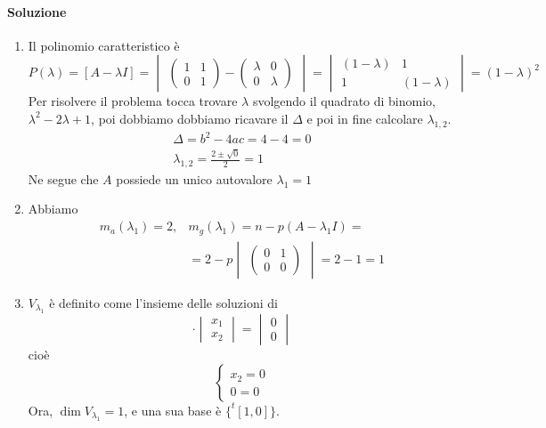 \documentclass{book}
\begin{document}
\paragraph{Soluzione}
\begin{enumerate}
\item Il polinomio caratteristico è
  \begin{equation*}
    P(\lambda)= [A-\lambda I] =
    \begin{vmatrix}
      \begin{pmatrix}
        1 & 1\\
        0 & 1
      \end{pmatrix}-
      \begin{pmatrix}
        \lambda & 0\\
        0 & \lambda
      \end{pmatrix}
    \end{vmatrix}=
    \begin{vmatrix}
      (1-\lambda) & 1 \\
      1 & (1-\lambda)
    \end{vmatrix}= (1-\lambda)^2
  \end{equation*}
Per risolvere il problema tocca trovare $\lambda$ svolgendo il quadrato di binomio, $\lambda^2-2\lambda+1$, poi dobbiamo dobbiamo ricavare il $\Delta$ e poi in fine calcolare $\lambda_{1,2}$.
\begin{eqnarray*}
  \Delta = b^2-4ac = 4 - 4 = 0\\
  \lambda_{1,2} = \frac{2\pm\sqrt{0}}{2}=1
\end{eqnarray*}
Ne segue che $A$ possiede un unico autovalore $\lambda_1=1$
\item Abbiamo
  \begin{eqnarray*}
    m_a(\lambda_1)=2, & m_g(\lambda_1)=n-p(A-\lambda_1I)=\\
    & = 2-p
      \begin{vmatrix}
        \begin{pmatrix}
          0 & 1 \\
          0 & 0
        \end{pmatrix}
      \end{vmatrix}= 2 - 1 = 1 
  \end{eqnarray*}
\item $V_{\lambda_1}$ è definito come l'insieme delle soluzioni di
  \begin{equation*}
    [A-\lambda_1I]\cdot\begin{vmatrix}
                         x_1\\
                         x_2
    \end{vmatrix}=
    \begin{vmatrix}
      0\\0
    \end{vmatrix}
  \end{equation*}
  cioè
  \begin{equation*}
    \begin{cases}
      x_2=0\\
      0=0
    \end{cases}
  \end{equation*}
  Ora, $\dim V_{\lambda_1}=1$, e una sua base è $\{^t[1,0]\}$.
\end{enumerate}
\end{document}
